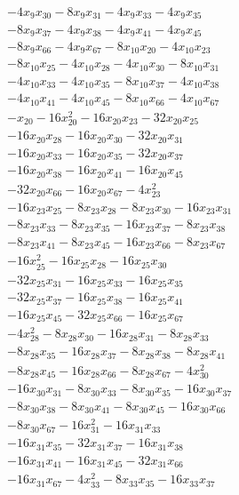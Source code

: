 \begin{align*}
&-4x_{9}x_{30} -8x_{9}x_{31} -4x_{9}x_{33} -4x_{9}x_{35}\\
&-8x_{9}x_{37} -4x_{9}x_{38} -4x_{9}x_{41} -4x_{9}x_{45}\\
&-8x_{9}x_{66} -4x_{9}x_{67} -8x_{10}x_{20} -4x_{10}x_{23}\\
&-8x_{10}x_{25} -4x_{10}x_{28} -4x_{10}x_{30} -8x_{10}x_{31}\\
&-4x_{10}x_{33} -4x_{10}x_{35} -8x_{10}x_{37} -4x_{10}x_{38}\\
&-4x_{10}x_{41} -4x_{10}x_{45} -8x_{10}x_{66} -4x_{10}x_{67}\\
&-x_{20} -16x_{20}^{2} -16x_{20}x_{23} -32x_{20}x_{25}\\
&-16x_{20}x_{28} -16x_{20}x_{30} -32x_{20}x_{31}\\
&-16x_{20}x_{33} -16x_{20}x_{35} -32x_{20}x_{37}\\
&-16x_{20}x_{38} -16x_{20}x_{41} -16x_{20}x_{45}\\
&-32x_{20}x_{66} -16x_{20}x_{67} -4x_{23}^{2}\\
&-16x_{23}x_{25} -8x_{23}x_{28} -8x_{23}x_{30} -16x_{23}x_{31}\\
&-8x_{23}x_{33} -8x_{23}x_{35} -16x_{23}x_{37} -8x_{23}x_{38}\\
&-8x_{23}x_{41} -8x_{23}x_{45} -16x_{23}x_{66} -8x_{23}x_{67}\\
&-16x_{25}^{2} -16x_{25}x_{28} -16x_{25}x_{30}\\
&-32x_{25}x_{31} -16x_{25}x_{33} -16x_{25}x_{35}\\
&-32x_{25}x_{37} -16x_{25}x_{38} -16x_{25}x_{41}\\
&-16x_{25}x_{45} -32x_{25}x_{66} -16x_{25}x_{67}\\
&-4x_{28}^{2} -8x_{28}x_{30} -16x_{28}x_{31} -8x_{28}x_{33}\\
&-8x_{28}x_{35} -16x_{28}x_{37} -8x_{28}x_{38} -8x_{28}x_{41}\\
&-8x_{28}x_{45} -16x_{28}x_{66} -8x_{28}x_{67} -4x_{30}^{2}\\
&-16x_{30}x_{31} -8x_{30}x_{33} -8x_{30}x_{35} -16x_{30}x_{37}\\
&-8x_{30}x_{38} -8x_{30}x_{41} -8x_{30}x_{45} -16x_{30}x_{66}\\
&-8x_{30}x_{67} -16x_{31}^{2} -16x_{31}x_{33}\\
&-16x_{31}x_{35} -32x_{31}x_{37} -16x_{31}x_{38}\\
&-16x_{31}x_{41} -16x_{31}x_{45} -32x_{31}x_{66}\\
&-16x_{31}x_{67} -4x_{33}^{2} -8x_{33}x_{35} -16x_{33}x_{37}\\

\end{align*}
